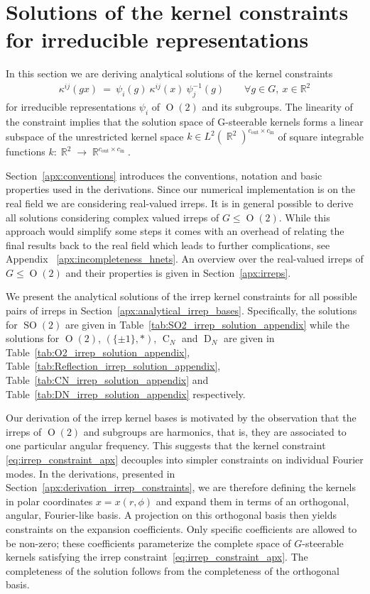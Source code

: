 \documentclass{article}
\newcommand{\apx}{Appendix\xspace
}
\DeclareMathOperator*{\R}{\mathbb{R}}
\renewcommand{\O}[1]{\ensuremath{\operatorname{O}(#1)}}
\newcommand{\SO}[1]{\ensuremath{\operatorname{SO}(#1)}}
\newcommand{\DN}{\ensuremath{\operatorname{D}_{\!N}}}
\newcommand{\CN}{\ensuremath{\operatorname{C}_{\!N}}}
\newcommand{\Flip}{(\{\pm 1\}, *)}
\begin{document}
 	
\section{Solutions of the kernel constraints for irreducible representations}
\label{apx:kernel_constraint_solution_apx}


In this section we are deriving analytical solutions of the kernel constraints
\begin{align}\label{eq:irrep_constraint_apx}
    \kappa^{ij}(gx)\ =\ \psi_i(g)\ \kappa^{ij}(x)\ \psi_j^{-1}(g)
    \qquad\forall g\in G,\ x\in\mathbb{R}^2
\end{align}
for irreducible representations $\psi_i$ of $\O2$ and its subgroups.
The linearity of the constraint implies that the solution space of G-steerable kernels forms a linear subspace of the unrestricted kernel space
$k\in L^2\!\left(\R^2\right)^{c_\text{out}\times c_\text{in}}$
of square integrable functions $k:\R^2\to\R^{c_\text{out}\times c_\text{in}}$.

Section~\ref{apx:conventions} introduces the conventions, notation and basic properties used in the derivations.
Since our numerical implementation is on the real field we are considering real-valued irreps.
It is in general possible to derive all solutions considering complex valued irreps of $G\leq\O2$.
While this approach would simplify some steps it 
comes with an overhead of relating the final results back to the real field which leads to further complications, see \apx~\ref{apx:incompleteness_hnets}.
An overview over the real-valued irreps of $G\leq\O2$ and their properties is given in Section~\ref{apx:irreps}.

We present the analytical solutions of the irrep kernel constraints for all possible pairs of irreps in Section~\ref{apx:analytical_irrep_bases}.
Specifically, the solutions for $\SO2$ are given in Table~\ref{tab:SO2_irrep_solution_appendix} while the solutions for $\O2$, $\Flip$, $\CN$ and $\DN$ are given in
Table~\ref{tab:O2_irrep_solution_appendix},
Table~\ref{tab:Reflection_irrep_solution_appendix},
Table~\ref{tab:CN_irrep_solution_appendix} and
Table~\ref{tab:DN_irrep_solution_appendix} respectively.

Our derivation of the irrep kernel bases is motivated by the observation that the irreps of $\O2$ and subgroups are harmonics, that is, they are associated to one particular angular frequency.
This suggests that the kernel constraint \eqref{eq:irrep_constraint_apx} decouples into simpler constraints on individual Fourier modes.
In the derivations, presented in Section~\ref{apx:derivation_irrep_constraints}, we are therefore defining the kernels in polar coordinates $x=x(r,\phi)$ and expand them in terms of an orthogonal, angular, Fourier-like basis.
A projection on this orthogonal basis then yields constraints on the expansion coefficients.
Only specific coefficients are allowed to be non-zero; these coefficients parameterize the complete space of $G$-steerable kernels satisfying the irrep constraint~\eqref{eq:irrep_constraint_apx}.
The completeness of the solution follows from the completeness of the orthogonal basis.
\end{document}
